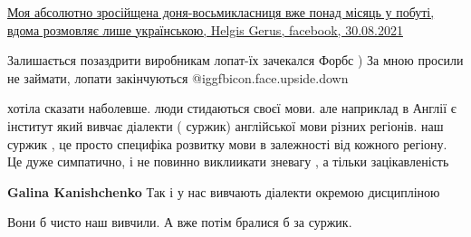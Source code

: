 \begin{itemize}
{\href{https://www.facebook.com/ol.geras.98/posts/808711979809806}{%
Моя абсолютно зросійщена доня-восьмикласниця вже понад місяць у побуті, вдома розмовляє лише українською, %
Helgis Gerus, facebook, 30.08.2021%
}

 
Залишається позаздрити виробникам лопат-їх зачекался Форбс ) За мною просили не
займати, лопати закінчуються  @igg{fbicon.face.upside.down} 

 

хотіла сказати наболевше. люди стидаються своєї мови. але наприклад в Англії є
інститут який вивчає діалекти ( суржик) англійської мови різних регіонів. наш
суржик , це просто специфіка розвитку мови в залежності від кожного регіону. Це
дуже симпатично, і не повинно виклиикати зневагу , а тільки зацікавленість

\begin{itemize}{
 
\textbf{Galina Kanishchenko} Так і у нас вивчають діалекти окремою дисципліною
}\end{itemize}

 
Вони б чисто наш вивчили. А вже потім бралися б за суржик.

\begin{itemize}{
 
}
\end{itemize}}
\end{itemize}
